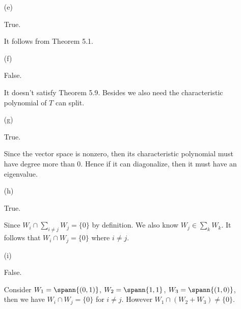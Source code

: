 \begin{Exercise}
\begin{enumerate}[(a)]
		\item[(e)]
		\begin{answer}
			True.
		\end{answer}
		\begin{solution}
			It follows from Theorem 5.1.
		\end{solution}
		
		\item[(f)]
		\begin{answer}
			False.
		\end{answer}
		\begin{solution}
			It doesn't satisfy Theorem 5.9. Besides we also need the characteristic polynomial of $T$ can split.
		\end{solution}
		
		\item[(g)]
		\begin{answer}
			True.
		\end{answer}
		\begin{solution}
			Since the vector space is nonzero, then its characteristic polynomial must have degree more than $0$. Hence if it can diagonalize, then it must have an eigenvalue.
		\end{solution}
		
		\item[(h)]
		\begin{answer}
			True.
		\end{answer}
		\begin{solution}
			Since $W_i\cap \sum_{i\neq j} W_j = \{0\}$ by definition. We also know $W_j \in \sum_{k} W_k$. It follows that $W_i \cap W_j =\{0\}$ where $i\neq j$.
		\end{solution}
		
		\item[(i)]
		\begin{answer}
			False.
		\end{answer}
		\begin{solution}
			Consider $W_1 = \spann\{(0,1)\}$, $W_2 = \spann\{1,1\}$, $W_3 = \spann\{(1,0)\}$, then we have $W_i\cap W_j = \{0\}$ for $i\neq j$. However $W_1\cap (W_2+W_3) \neq \{0\}$.
		\end{solution}
		
	\end{enumerate}
\end{Exercise}